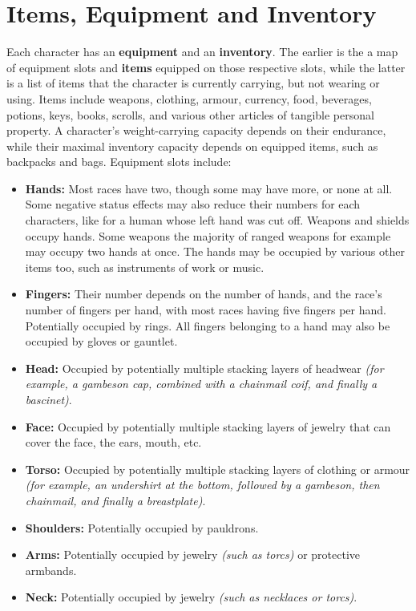\documentclass[openany,11pt,a4paper]{book}
\begin{document}
\section{Items, Equipment and Inventory}
Each character has an \textbf{equipment} and an \textbf{inventory}. The earlier is the a map of equipment slots and \textbf{items} equipped on those respective slots, while the latter is a list of items that the character is currently carrying, but not wearing or using.\newline
Items include weapons, clothing, armour, currency, food, beverages, potions, keys, books, scrolls, and various other articles of tangible personal property. A character's weight-carrying capacity depends on their endurance, while their maximal inventory capacity depends on equipped items, such as backpacks and bags. Equipment slots include:
\begin{itemize}
\item \textbf{Hands:} Most races have two, though some may have more, or none at all. Some negative status effects may also reduce their numbers for each characters, like for a human whose left hand was cut off. Weapons and shields occupy hands. Some weapons \textemdash the majority of ranged weapons for example \textemdash may occupy two hands at once. The hands may be occupied by various other items too, such as instruments of work or music.
\item \textbf{Fingers:} Their number depends on the number of hands, and the race's number of fingers per hand, with most races having five fingers per hand. Potentially occupied by rings. All fingers belonging to a hand may also be occupied by gloves or gauntlet.
\item \textbf{Head:} Occupied by potentially multiple stacking layers of headwear \textit{(for example, a gambeson cap, combined with a chainmail coif, and finally a bascinet)}.
\item \textbf{Face:} Occupied by potentially multiple stacking layers of jewelry that can cover the face, the ears, mouth, etc.
\item \textbf{Torso:} Occupied by potentially multiple stacking layers of clothing or armour \textit{(for example, an undershirt at the bottom, followed by a gambeson, then chainmail, and finally a breastplate)}.
\item \textbf{Shoulders:} Potentially occupied by pauldrons.
\item \textbf{Arms:} Potentially occupied by jewelry \textit{(such as torcs)} or protective armbands.
\item \textbf{Neck:} Potentially occupied by jewelry \textit{(such as necklaces or torcs)}.

\end{itemize}
\end{document}
